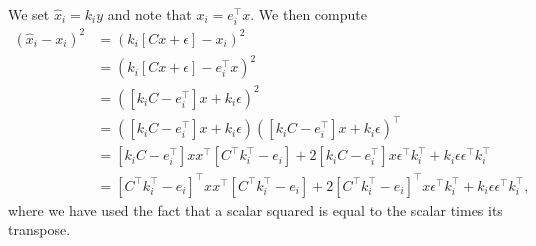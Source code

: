 {We set $\widehat{x}_i = k_i y$ and note that $x_i = e_i^\top x$. We then compute
\begin{align*}
 \left( \widehat{x}_i - x_i \right)^2 &=  \left(k_i [Cx+\epsilon] - x_i \right)^2 \\
 &=  \left(k_i [Cx+\epsilon] - e_i^\top x \right)^2\\
 &= \left([ k_i C - e^\top_i ]x+k_i\epsilon \right)^2 \\
 &= \left([ k_i C - e^\top_i ]x+k_i\epsilon \right) \left([ k_i C - e^\top_i ]x+k_i\epsilon \right)^\top \\
  &= [ k_iC-e_i^\top] x x^\top [C^\top k_i^\top-e_i] + 2 [k_iC-e_i^\top] x \epsilon^\top k_i^\top + k_i\epsilon \epsilon^\top k_i^\top \\
 &= [C^\top k_i^\top-e_i]^\top x x^\top [C^\top k_i^\top-e_i] + 2 [C^\top k_i^\top-e_i]^\top x \epsilon^\top k_i^\top + k_i\epsilon \epsilon^\top k_i^\top,
\end{align*}
where we have used the fact that a scalar squared is equal to the scalar times its transpose.

}
